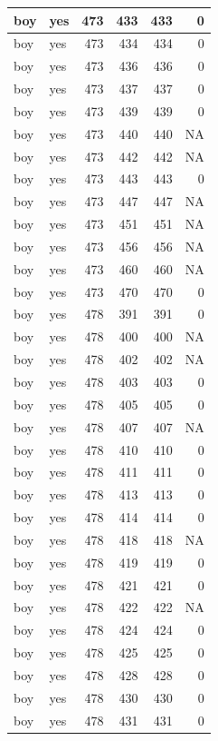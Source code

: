 \documentclass[man]{apa6}
\begin{document}
\begin{tabular}{l|l|r|r|r|r}
\hline
boy & yes & 473 & 433 & 433 & 0\\
\hline
boy & yes & 473 & 434 & 434 & 0\\
\hline
boy & yes & 473 & 436 & 436 & 0\\
\hline
boy & yes & 473 & 437 & 437 & 0\\
\hline
boy & yes & 473 & 439 & 439 & 0\\
\hline
boy & yes & 473 & 440 & 440 & NA\\
\hline
boy & yes & 473 & 442 & 442 & NA\\
\hline
boy & yes & 473 & 443 & 443 & 0\\
\hline
boy & yes & 473 & 447 & 447 & NA\\
\hline
boy & yes & 473 & 451 & 451 & NA\\
\hline
boy & yes & 473 & 456 & 456 & NA\\
\hline
boy & yes & 473 & 460 & 460 & NA\\
\hline
boy & yes & 473 & 470 & 470 & 0\\
\hline
boy & yes & 478 & 391 & 391 & 0\\
\hline
boy & yes & 478 & 400 & 400 & NA\\
\hline
boy & yes & 478 & 402 & 402 & NA\\
\hline
boy & yes & 478 & 403 & 403 & 0\\
\hline
boy & yes & 478 & 405 & 405 & 0\\
\hline
boy & yes & 478 & 407 & 407 & NA\\
\hline
boy & yes & 478 & 410 & 410 & 0\\
\hline
boy & yes & 478 & 411 & 411 & 0\\
\hline
boy & yes & 478 & 413 & 413 & 0\\
\hline
boy & yes & 478 & 414 & 414 & 0\\
\hline
boy & yes & 478 & 418 & 418 & NA\\
\hline
boy & yes & 478 & 419 & 419 & 0\\
\hline
boy & yes & 478 & 421 & 421 & 0\\
\hline
boy & yes & 478 & 422 & 422 & NA\\
\hline
boy & yes & 478 & 424 & 424 & 0\\
\hline
boy & yes & 478 & 425 & 425 & 0\\
\hline
boy & yes & 478 & 428 & 428 & 0\\
\hline
boy & yes & 478 & 430 & 430 & 0\\
\hline
boy & yes & 478 & 431 & 431 & 0\\

\end{tabular}
\end{document}
